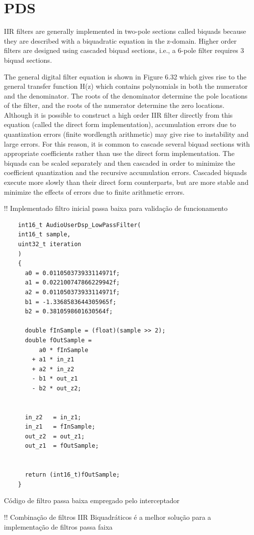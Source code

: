 \section{PDS}

\color{red}
IIR filters are generally implemented in two-pole sections called biquads because
they are described with a biquadratic equation in the z-domain. Higher order filters
are designed using cascaded biquad sections, i.e., a 6-pole filter requires 3 biquad
sections.

The general digital filter equation is shown in Figure 6.32 which gives rise to the
general transfer function H(z) which contains polynomials in both the numerator
and the denominator. The roots of the denominator determine the pole locations of
the filter, and the roots of the numerator determine the zero locations. Although it
is possible to construct a high order IIR filter directly from this equation (called the
direct form implementation), accumulation errors due to quantization errors (finite
wordlength arithmetic) may give rise to instability and large errors. For this reason,
it is common to cascade several biquad sections with appropriate coefficients rather
than use the direct form implementation. The biquads can be scaled separately and
then cascaded in order to minimize the coefficient quantization and the recursive
accumulation errors. Cascaded biquads execute more slowly than their direct form
counterparts, but are more stable and minimize the effects of errors due to finite
arithmetic errors.
\color{black}

!! Implementado filtro inicial passa baixa para validação de funcionamento
\begin{sourcecode}[!ht]
\centering
\begin{verbatim}
    int16_t AudioUserDsp_LowPassFilter(
    int16_t sample, 
    uint32_t iteration
    )
    {
      a0 = 0.011050373933114971f;
      a1 = 0.022100747866229942f;
      a2 = 0.011050373933114971f;
      b1 = -1.3368583644305965f;
      b2 = 0.3810598601630564f;
    
      double fInSample = (float)(sample >> 2);
      double fOutSample = 
          a0 * fInSample 
        + a1 * in_z1 
        + a2 * in_z2
        - b1 * out_z1
        - b2 * out_z2;
    
    
      in_z2   = in_z1;
      in_z1   = fInSample;
      out_z2  = out_z1;
      out_z1  = fOutSample;
    
    
      return (int16_t)fOutSample;
    }

\end{verbatim}
\caption{Código de filtro passa baixa empregado pelo interceptador}\label{code:CML}
\end{sourcecode}
!! Combinação de filtros IIR Biquadráticos é a melhor solução para a implementação de filtros passa faixa

